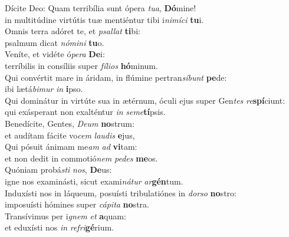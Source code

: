 \evenverse Dícite Deo: Quam terribília sunt ópera \textit{tu}\textit{a}, \textbf{Dó}mine!~\*\\
\evenverse in multitúdine virtútis tuæ mentiéntur tibi i\textit{ni}\textit{mí}\textit{ci} \textbf{tu}i.\\
\oddverse Omnis terra adóret te, et \textit{psal}\textit{lat} \textbf{ti}bi:~\*\\
\oddverse psalmum dicat \textit{nó}\textit{mi}\textit{ni} \textbf{tu}o.\\
\evenverse Veníte, et vidéte ó\textit{pe}\textit{ra} \textbf{De}i:~\*\\
\evenverse terríbilis in consíliis super \textit{fí}\textit{li}\textit{os} \textbf{hó}minum.\\
\oddverse Qui convértit mare in áridam, in flúmine pertran\textit{sí}\textit{bunt} \textbf{pe}de:~\*\\
\oddverse ibi lætá\textit{bi}\textit{mur} \textit{in} \textbf{i}pso.\\
\evenverse Qui dominátur in virtúte sua in ætérnum, óculi ejus super Gen\textit{tes} \textit{re}\textbf{spí}ciunt:~\*\\
\evenverse qui exásperant non exalténtur \textit{in} \textit{se}\textit{me}\textbf{tí}psis.\\
\oddverse Benedícite, Gentes, \textit{De}\textit{um} \textbf{no}strum:~\*\\
\oddverse et audítam fácite vo\textit{cem} \textit{lau}\textit{dis} \textbf{e}jus,\\
\evenverse Qui pósuit ánimam me\textit{am} \textit{ad} \textbf{vi}tam:~\*\\
\evenverse et non dedit in commotió\textit{nem} \textit{pe}\textit{des} \textbf{me}os.\\
\oddverse Quóniam probá\textit{sti} \textit{nos}, \textbf{De}us:~\*\\
\oddverse igne nos examinásti, sicut exami\textit{ná}\textit{tur} \textit{ar}\textbf{gén}tum.\\
\evenverse Induxísti nos in láqueum, posuísti tribulatiónes in \textit{dor}\textit{so} \textbf{no}stro:~\*\\
\evenverse imposuísti hómines super \textit{cá}\textit{pi}\textit{ta} \textbf{no}stra.\\
\oddverse Transívimus per i\textit{gnem} \textit{et} \textbf{a}quam:~\*\\
\oddverse et eduxísti nos \textit{in} \textit{re}\textit{fri}\textbf{gé}rium.\\
